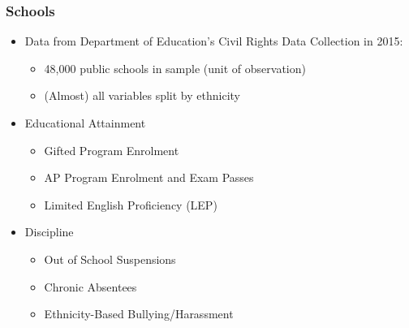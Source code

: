 \documentclass{beamer}
\begin{document}
\begin{frame}
\frametitle{Schools}
\begin{itemize}
\item Data from Department of Education's Civil Rights Data Collection in 2015:
\begin{itemize}
\item 48,000 public schools in sample (unit of observation)
\item (Almost) all variables split by ethnicity
\end{itemize}
\item Educational Attainment
\begin{itemize}
\item Gifted Program Enrolment
\item AP Program Enrolment and Exam Passes
\item Limited English Proficiency (LEP)
\end{itemize}
\item Discipline
\begin{itemize}
\item Out of School Suspensions
\item Chronic Absentees
\item Ethnicity-Based Bullying/Harassment
\end{itemize}
\end{itemize}
\end{frame}
\end{document}
